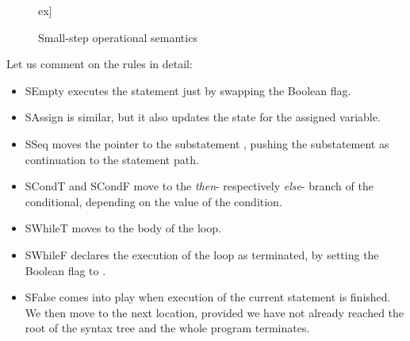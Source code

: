 \begin{isabellebody}
\begin{figure}[h!]
\begin{isamarkuptext}
\begin{center}
\begin{small}
\2ex]
\end{small}
\end{center}\end{isamarkuptext}\isamarkuptrue \figline{}
\caption{Small-step operational semantics}\label{fig:smallStep}
\end{figure}
\begin{isamarkuptext}Let us comment on the rules in detail:
\begin{itemize}
\item {\sc SEmpty} executes the  statement just by swapping the Boolean flag.
\item {\sc SAssign} is similar, but it also updates the state for the assigned variable.
\item {\sc SSeq} moves the pointer to the substatement , 
  pushing the substatement  as continuation to the statement path. 
\item {\sc SCondT} and {\sc SCondF} move to the \emph{then}- respectively \emph{else}- 
  branch of the conditional, depending on the value of the condition. 
\item {\sc SWhileT} moves to the body of the loop.
\item {\sc SWhileF} declares the execution of the loop as terminated, 
  by setting the Boolean flag to .
\item {\sc SFalse} comes into play when execution of the current statement is finished. 
  We then move to the next location, provided we have not already reached the root of 
  the syntax tree and the whole program terminates.
\end{itemize}


\end{isamarkuptext}
\end{isabellebody}
